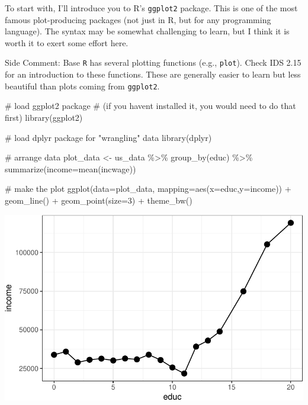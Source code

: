 \documentclass[
  letterpaper,
  DIV=11,
  numbers=noendperiod]{scrreprt}
\newenvironment{Shaded}{\begin{snugshade}}{\end{snugshade}}
\newcommand{\AttributeTok}[1]{\textcolor[rgb]{0.40,0.45,0.13}{#1}}
\newcommand{\CommentTok}[1]{\textcolor[rgb]{0.37,0.37,0.37}{#1}}
\newcommand{\DecValTok}[1]{\textcolor[rgb]{0.68,0.00,0.00}{#1}}
\newcommand{\FunctionTok}[1]{\textcolor[rgb]{0.28,0.35,0.67}{#1}}
\newcommand{\NormalTok}[1]{\textcolor[rgb]{0.00,0.23,0.31}{#1}}
\newcommand{\OtherTok}[1]{\textcolor[rgb]{0.00,0.23,0.31}{#1}}
\newcommand{\SpecialCharTok}[1]{\textcolor[rgb]{0.37,0.37,0.37}{#1}}
\begin{document}
To start with, I'll introduce you to R's \texttt{ggplot2} package. This
is one of the most famous plot-producing packages (not just in R, but
for any programming language). The syntax may be somewhat challenging to
learn, but I think it is worth it to exert some effort here.

{Side Comment:} Base \texttt{R} has several plotting functions (e.g.,
\texttt{plot}). Check IDS 2.15 for an introduction to these functions.
These are generally easier to learn but less beautiful than plots coming
from \texttt{ggplot2}.

\begin{Shaded}
\begin{Highlighting}[]
\CommentTok{\# load ggplot2 package }
\CommentTok{\# (if you haven\textquotesingle{}t installed it, you would need to do that first)}
\FunctionTok{library}\NormalTok{(ggplot2)}

\CommentTok{\# load dplyr package for "wrangling" data}
\FunctionTok{library}\NormalTok{(dplyr)}
\end{Highlighting}
\end{Shaded}

\begin{Shaded}
\begin{Highlighting}[]
\CommentTok{\# arrange data}
\NormalTok{plot\_data }\OtherTok{\textless{}{-}}\NormalTok{ us\_data }\SpecialCharTok{\%\textgreater{}\%}
    \FunctionTok{group\_by}\NormalTok{(educ) }\SpecialCharTok{\%\textgreater{}\%}
    \FunctionTok{summarize}\NormalTok{(}\AttributeTok{income=}\FunctionTok{mean}\NormalTok{(incwage))}

\CommentTok{\# make the plot}
\FunctionTok{ggplot}\NormalTok{(}\AttributeTok{data=}\NormalTok{plot\_data,}
       \AttributeTok{mapping=}\FunctionTok{aes}\NormalTok{(}\AttributeTok{x=}\NormalTok{educ,}\AttributeTok{y=}\NormalTok{income)) }\SpecialCharTok{+}
    \FunctionTok{geom\_line}\NormalTok{() }\SpecialCharTok{+} 
    \FunctionTok{geom\_point}\NormalTok{(}\AttributeTok{size=}\DecValTok{3}\NormalTok{) }\SpecialCharTok{+} 
    \FunctionTok{theme\_bw}\NormalTok{()}
\end{Highlighting}
\end{Shaded}

\includegraphics{02-probability_files/figure-pdf/unnamed-chunk-12-1.pdf}
\end{document}
